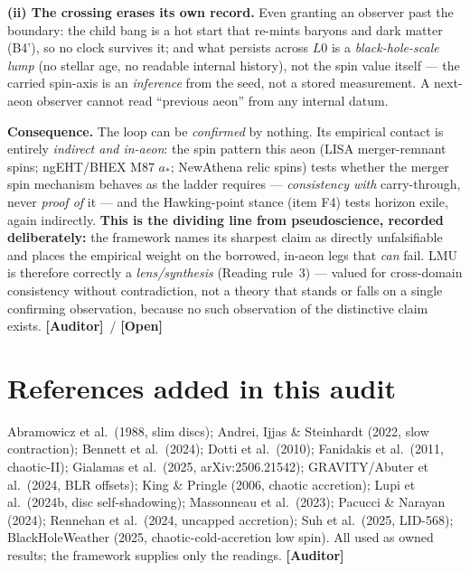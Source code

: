 \documentclass[11pt]{article}
\newcommand{\Open}{\textbf{\textcolor{gray!10!black}{[Open]}}}
\newcommand{\Auditor}{\textbf{\textcolor{teal!55!black}{[Auditor]}}}
\begin{document}
\textbf{(ii) The crossing erases its own record.} Even granting an observer past the boundary: the child bang is a hot start that re-mints baryons and dark matter (B4'), so no clock survives it; and what persists across $L0$ is a \emph{black-hole-scale lump} (no stellar age, no readable internal history), not the spin value itself --- the carried spin-axis is an \emph{inference} from the seed, not a stored measurement. A next-aeon observer cannot read ``previous aeon'' from any internal datum.

\textbf{Consequence.} The loop can be \emph{confirmed} by nothing. Its empirical contact is entirely \emph{indirect and in-aeon}: the spin pattern this aeon (LISA merger-remnant spins; ngEHT/BHEX M87 $a_\ast$; NewAthena relic spins) tests whether the merger spin mechanism behaves as the ladder requires --- \emph{consistency with} carry-through, never \emph{proof of} it --- and the Hawking-point stance (item F4) tests horizon exile, again indirectly. \textbf{This is the dividing line from pseudoscience, recorded deliberately:} the framework names its sharpest claim as directly unfalsifiable and places the empirical weight on the borrowed, in-aeon legs that \emph{can} fail. LMU is therefore correctly a \emph{lens/synthesis} (Reading rule~3) --- valued for cross-domain consistency without contradiction, not a theory that stands or falls on a single confirming observation, because no such observation of the distinctive claim exists. \Auditor\ / \Open

\section*{References added in this audit}
\small
Abramowicz et al.\ (1988, slim discs); Andrei, Ijjas \& Steinhardt (2022, slow contraction); Bennett et al.\ (2024); Dotti et al.\ (2010); Fanidakis et al.\ (2011, chaotic-II); Gialamas et al.\ (2025, arXiv:2506.21542); GRAVITY/Abuter et al.\ (2024, BLR offsets); King \& Pringle (2006, chaotic accretion); Lupi et al.\ (2024b, disc self-shadowing); Massonneau et al.\ (2023); Pacucci \& Narayan (2024); Rennehan et al.\ (2024, uncapped accretion); Suh et al.\ (2025, LID-568); BlackHoleWeather (2025, chaotic-cold-accretion low spin). All used as owned results; the framework supplies only the readings. \Auditor
\normalsize
\end{document}
